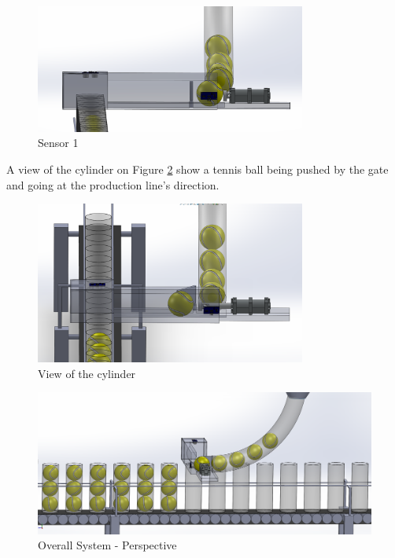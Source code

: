 \documentclass[transmag]{IEEEtran}
\begin{document}
\begin{figure}[h]
\centerline{\includegraphics[width=3.5in]{./images/FirstUT}}
\caption{Sensor 1\label{FirstUT}}
\end{figure}

A view of the cylinder on Figure \ref{Line3} show a tennis ball being pushed by the gate and going at the production line's direction.

\begin{figure}[h]
\centerline{\includegraphics[width=3.5in]{./images/Line3}}
\caption{View of the cylinder\label{Line3}}
\end{figure}



\begin{figure}
\centerline{\includegraphics[width=7in]{./images/Line2}}
\caption{Overall System - Perspective\label{Line2}}
\end{figure}
\end{document}
